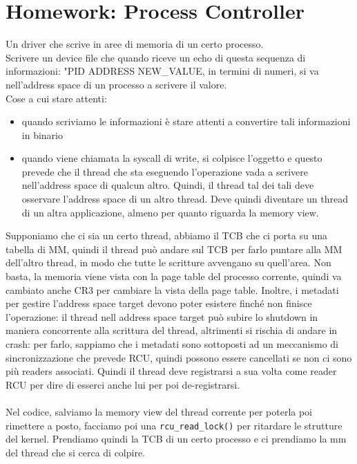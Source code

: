 \documentclass[12pt, oneside]{extbook}
\begin{document}
\section*{Homework: Process Controller}
Un driver che scrive in aree di memoria di un certo processo.\\Scrivere un device file che quando riceve un echo di questa sequenza di informazioni: "PID ADDRESS NEW\_VALUE, in termini di numeri, si va nell'address space di un processo a scrivere il valore.\\Cose a cui stare attenti:
\begin{itemize}
	\item quando scriviamo le informazioni è stare attenti a convertire tali informazioni in binario
	\item quando viene chiamata la syscall di write, si colpisce l'oggetto e questo prevede che il thread che sta eseguendo l'operazione vada a scrivere nell'address space di qualcun altro. Quindi, il thread tal dei tali deve osservare l'address space di un altro thread. Deve quindi diventare un thread di un altra applicazione, almeno per quanto riguarda la memory view.
\end{itemize}
Supponiamo che ci sia un certo thread, abbiamo il TCB che ci porta su una tabella di MM, quindi il thread può andare sul TCB per farlo puntare alla MM dell'altro thread, in modo che tutte le scritture avvengano su quell'area. Non basta, la memoria viene vista con la page table del processo corrente, quindi va cambiato anche CR3 per cambiare la vista della page table. Inoltre, i metadati per gestire l'address space target devono poter esistere finché non finisce l'operazione: il thread nell address space target può subire lo shutdown in maniera concorrente alla scrittura del thread, altrimenti si rischia di andare in crash: per farlo, sappiamo che i metadati sono sottoposti ad un meccanismo di sincronizzazione che prevede RCU, quindi possono essere cancellati se non ci sono più readers associati. Quindi il thread deve registrarsi a sua volta come reader RCU per dire di esserci anche lui per poi de-registrarsi.\\\\Nel codice, salviamo la memory view del thread corrente per poterla poi rimettere a posto, facciamo poi una \texttt{rcu\_read\_lock()} per ritardare le strutture del kernel. Prendiamo quindi la TCB di un certo processo e ci prendiamo la mm del thread che si cerca di colpire.
\end{document}
